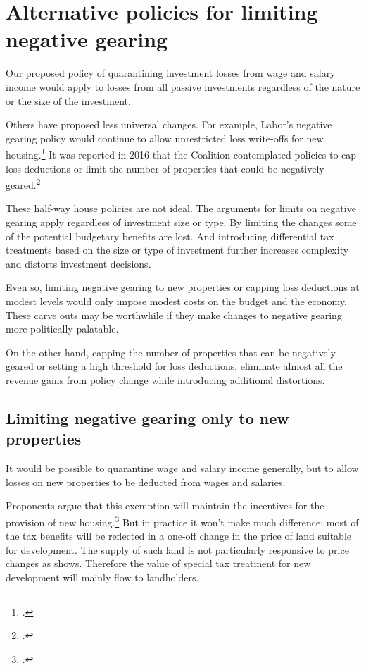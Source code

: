 \section{Alternative policies for limiting negative gearing}
Our proposed policy of quarantining investment losses from wage and salary income would apply to losses from all passive investments regardless of the nature or the size of the investment. 

Others have proposed less universal changes. For example, Labor’s negative gearing policy would continue to allow unrestricted loss write-offs for new housing.\footcite{ALP2016PositivePlanHousing} It was reported in 2016 that the Coalition contemplated policies to cap loss deductions or limit the number of properties that could be negatively geared.\footcite{Coorey2016}  

These half-way house policies are not ideal. The arguments for limits on negative gearing apply regardless of investment size or type. By limiting the changes some of the potential budgetary benefits are lost. And introducing differential tax treatments based on the size or type of investment further increases complexity and distorts investment decisions. 

Even so, limiting negative gearing to new properties or capping loss deductions at modest levels would only impose modest costs on the budget and the economy. These carve outs may be worthwhile if they make changes to negative gearing more politically palatable.

On the other hand, capping the number of properties that can be negatively geared or setting a high threshold for loss deductions, eliminate almost all the revenue gains from policy change while introducing additional distortions. 

\subsection{Limiting negative gearing only to new properties}
It would be possible to quarantine wage and salary income generally, but to allow losses on new properties to be deducted from wages and salaries. 

Proponents argue that this exemption will maintain the incentives for the provision of new housing.\footcite[][28]{McKellInstitute2015SwitchingGears}  But in practice it won’t make much difference: most of the tax benefits will be reflected in a one-off change in the price of land suitable for development. The supply of such land is not particularly responsive to price changes as  shows. Therefore the value of special tax treatment for new development will mainly flow to landholders. 

